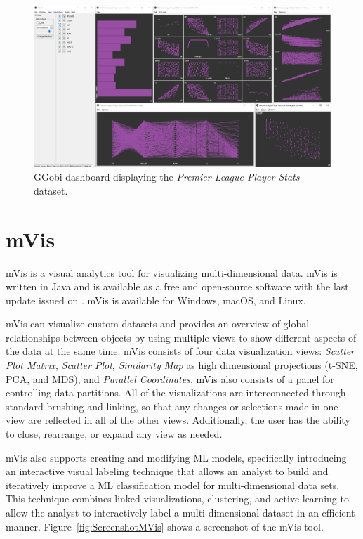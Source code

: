 \begin{figure}[tp]
\centering
\includegraphics[frame,keepaspectratio,width=\linewidth,height=\halfh]
{images/screenshot-ggobi.png}

\caption[GGobi Dashboard]
{%
GGobi dashboard displaying the \emph{Premier League Player Stats} dataset.
}
\label{fig:ScreenshotGGobi}
\end{figure}


\section{mVis}

mVis \parencite{CHEGINI20199} is a visual analytics tool for visualizing
multi-dimensional data. mVis is written in Java and is available as a free
and open-source software with the last update issued on
. mVis is available for Windows, macOS, and
Linux.

mVis can visualize custom datasets and provides an overview of global
relationships between objects by using multiple views to show different
aspects of the data at the same time. mVis consists of four data
visualization views: \emph{Scatter Plot Matrix}, \emph{Scatter Plot},
\emph{Similarity Map} as high dimensional projections (t-SNE, PCA, and
MDS), and \emph{Parallel Coordinates}. mVis also consists of a panel for
controlling data partitions. All of the visualizations are interconnected
through standard brushing and linking, so that any changes or selections
made in one view are reflected in all of the other views. Additionally,
the user has the ability to close, rearrange, or expand any view as
needed.

mVis also supports creating and modifying ML models, specifically
introducing an interactive visual labeling technique that allows an
analyst to build and iteratively improve a ML classification model for
multi-dimensional data sets. This technique combines linked
visualizations, clustering, and active learning to allow the analyst to
interactively label a multi-dimensional dataset in an efficient manner.
Figure~\ref{fig:ScreenshotMVis} shows a screenshot of the mVis tool.




